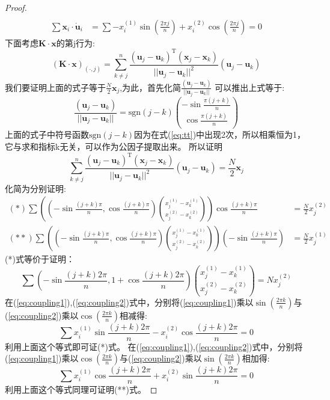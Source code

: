 \begin{proof}
\begin{align}
\label{eq:coupling1}\\
\sum \bm{x}_i \cdot \mathring{\bm{u}}_i &=\sum -x_i^{(1)} \sin(\frac{2\pi j}{n})+x_i^{(2)} \cos(\frac{2\pi j}{n}) =0\label{eq:coupling2}
\end{align}
下面考虑$\bm{K}\cdot \bm{x}$的第j行为:
\begin{equation}\label{eq:tt}
\left(\bm{K}\cdot \bm{x}\right)_{(\cdot,j)}=\sum_{k\neq j}^n \frac{(\bm{u}_j-\bm{u}_k)^{\textrm{T}} (\bm{x}_j-\bm{x}_k)}{||\bm{u}_j-\bm{u}_k||^2}(\bm{u}_j-\bm{u}_k)
\end{equation}
我们要证明上面的式子等于$\frac{N}{2}\bm{x}_j$,为此，首先化简$\frac{(\bm{u}_j-\bm{u}_k)}{||\bm{u}_j-\bm{u}_k||}$
可以推出上式等于:
\begin{equation}
\frac{(\bm{u}_j-\bm{u}_k)}{||\bm{u}_j-\bm{u}_k||}=\text{sgn}(j-k)\binom{-\sin\frac{\pi(j+k)}{n}}{\cos\frac{\pi(j+k)}{n}}
\end{equation}
上面的式子中符号函数$\text{sgn}(j-k)$因为在式(\ref{eq:tt})中出现2次，所以相乘恒为1，它与求和指标k无关，可以作为公因子提取出来。
所以证明\[
\sum_{k\neq j}^n \frac{(\bm{u}_j-\bm{u}_k)^{\textrm{T}} (\bm{x}_j-\bm{x}_k)}{||\bm{u}_j-\bm{u}_k||^2}(\bm{u}_j-\bm{u}_k)=\frac{N}{2}\bm{x}_j
\]
化简为分别证明:
\begin{align*}
(*)\sum ((-\sin\frac{(j+k)\pi}{n},\cos\frac{(j+k)\pi}{n})\binom{x_j^{(1)}-x_k^{(1)}}{x_j^{(2)}-x_k^{(2)}})
\cos\frac{(j+k)\pi}{n}&=\frac{N}{2}x_j^{(2)}\\
(**)\sum ((-\sin\frac{(j+k)\pi}{n},\cos\frac{(j+k)\pi}{n})\binom{x_j^{(1)}-x_k^{(1)}}{x_j^{(2)}-x_k^{(2)}})
(-\sin\frac{(j+k)\pi}{n})&=\frac{N}{2}x_j^{(1)}
\end{align*}
(*)式等价于证明：
\[
\sum (-\sin\frac{(j+k)2\pi}{n},1+\cos\frac{(j+k)2\pi}{n})\binom{x_j^{(1)}-x_k^{(1)}}{x_j^{(2)}-x_k^{(2)}}=Nx_j^{(2)}
\]
在(\ref{eq:coupling1}),(\ref{eq:coupling2})式中，分别将(\ref{eq:coupling1})乘以$\sin(\frac{2\pi k}{n})$与(\ref{eq:coupling2})乘以$\cos(\frac{2\pi k}{n})$相减得:
\begin{equation}
\sum x_i^{(1)}\sin\frac{(j+k)2\pi}{n}-x_i^{(2)}\cos\frac{(j+k)2\pi}{n}=0
\end{equation}
利用上面这个等式即可证(*)式。
在(\ref{eq:coupling1}),(\ref{eq:coupling2})式中，分别将(\ref{eq:coupling1})乘以$\cos(\frac{2\pi k}{n})$与(\ref{eq:coupling2})乘以$\sin(\frac{2\pi k}{n})$相加得:
\begin{equation}
\sum x_i^{(1)}\cos\frac{(j+k)2\pi}{n}+x_i^{(2)}\sin\frac{(j+k)2\pi}{n}=0
\end{equation}
利用上面这个等式同理可证明(**)式。
\end{proof}
